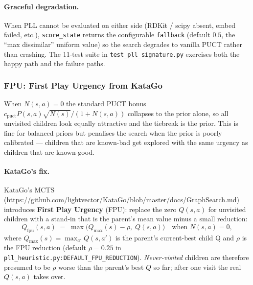 \paragraph{Graceful degradation.}
When PLL cannot be evaluated on either side (RDKit / scipy
absent, embed failed, etc.), \texttt{score\_state} returns
the configurable \texttt{fallback} (default $0.5$, the
``max dissimilar'' uniform value) so the search degrades to
vanilla PUCT rather than crashing.  The 11-test suite in
\texttt{test\_pll\_signature.py} exercises both the happy
path and the failure paths.

\subsubsection{FPU: First Play Urgency from KataGo}
\label{sec:pll-fpu}

When $N(s, a) = 0$ the standard PUCT bonus
$c_{\mathrm{puct}} P(s, a) \sqrt{N(s)} / (1 + N(s, a))$
collapses to the prior alone, so all unvisited children look
equally attractive and the tiebreak is the prior.  This is
fine for balanced priors but penalises the search when the
prior is poorly calibrated --- children that are known-bad
get explored with the same urgency as children that are
known-good.

\paragraph{KataGo's fix.}
KataGo's MCTS
(https://github.com/lightvector/KataGo/blob/master/docs/GraphSearch.md)
introduces \textbf{First Play Urgency} (FPU): replace the
zero $Q(s, a)$ for unvisited children with a stand-in that
is the parent's mean value minus a small reduction:
\begin{equation}
  \label{eq:fpu}
  Q_{\mathrm{fpu}}(s, a) \;=\;
    \max\bigl( Q_{\max}(s) - \rho,\; Q(s, a) \bigr)
    \quad \text{when } N(s, a) = 0,
\end{equation}
where $Q_{\max}(s) = \max_{a'} Q(s, a')$ is the parent's
current-best child Q and $\rho$ is the FPU reduction
(default $\rho = 0.25$ in
\texttt{pll\_heuristic.py:DEFAULT\_FPU\_REDUCTION}).
\emph{Never-visited} children are therefore presumed to be
$\rho$ worse than the parent's best $Q$ so far; after one
visit the real $Q(s, a)$ takes over.

